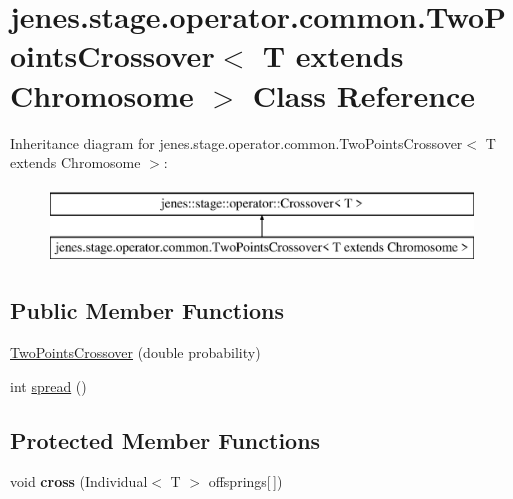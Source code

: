 \hypertarget{classjenes_1_1stage_1_1operator_1_1common_1_1_two_points_crossover_3_01_t_01extends_01_chromosome_01_4}{\section{jenes.\-stage.\-operator.\-common.\-Two\-Points\-Crossover$<$ T extends Chromosome $>$ Class Reference}
\label{classjenes_1_1stage_1_1operator_1_1common_1_1_two_points_crossover_3_01_t_01extends_01_chromosome_01_4}
}
Inheritance diagram for jenes.\-stage.\-operator.\-common.\-Two\-Points\-Crossover$<$ T extends Chromosome $>$\-:\begin{figure}[H]
\begin{center}
\leavevmode
\includegraphics[height=2.000000cm]{classjenes_1_1stage_1_1operator_1_1common_1_1_two_points_crossover_3_01_t_01extends_01_chromosome_01_4}
\end{center}
\end{figure}
\subsection*{Public Member Functions}
\begin{DoxyCompactItemize}
\item 
\hyperlink{classjenes_1_1stage_1_1operator_1_1common_1_1_two_points_crossover_3_01_t_01extends_01_chromosome_01_4_ab7fe58d08e9e9b89881661c16e80f19e}{Two\-Points\-Crossover} (double probability)
\item 
int \hyperlink{classjenes_1_1stage_1_1operator_1_1common_1_1_two_points_crossover_3_01_t_01extends_01_chromosome_01_4_a30115e5f2250765209bed48bda1e5155}{spread} ()
\end{DoxyCompactItemize}
\subsection*{Protected Member Functions}
\begin{DoxyCompactItemize}
\item 
\hypertarget{classjenes_1_1stage_1_1operator_1_1common_1_1_two_points_crossover_3_01_t_01extends_01_chromosome_01_4_a5cf79fb6f728917f5ba48960ff6814ed}{void {\bfseries cross} (Individual$<$ T $>$ offsprings\mbox{[}$\,$\mbox{]})}\label{classjenes_1_1stage_1_1operator_1_1common_1_1_two_points_crossover_3_01_t_01extends_01_chromosome_01_4_a5cf79fb6f728917f5ba48960ff6814ed}

\end{DoxyCompactItemize}


